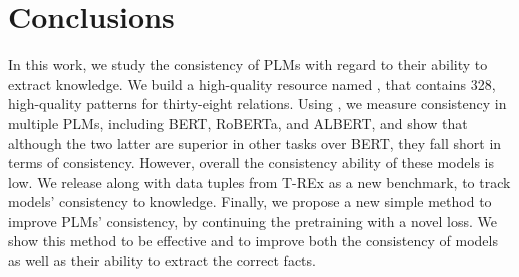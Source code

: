 \section{Conclusions}
\label{sec:conclusions}

In this work, we study the consistency of PLMs with regard to their ability to extract knowledge.
We build a high-quality resource named \resource{}, that contains 328, high-quality patterns for thirty-eight relations.
Using \resource{}, we measure consistency in multiple PLMs, including BERT, RoBERTa, and ALBERT, and show that although the two latter are superior in other tasks over BERT, they fall short in terms of consistency. However, overall the consistency ability of these models is low.
We release \resource{} along with data tuples from T-REx as a new benchmark, to track models' consistency to knowledge.
Finally, we propose a new simple method to improve PLMs' consistency, by continuing the pretraining with a novel loss. We show this method to be effective and to improve both the consistency of models as well as their ability to extract the correct facts.
